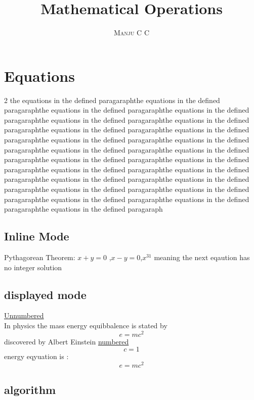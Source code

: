 \documentclass[12pt]{book}
\begin{document}
\title {\textbf {Mathematical Operations}}
\author{\textsc{Manju C C}}
\date {}
\maketitle 

\chapter{Equations}
\begin {multicols}{2}
the equations in the defined paragaraphthe equations in the defined paragaraphthe equations in the defined paragaraphthe equations in the defined paragaraphthe equations in the defined paragaraphthe equations in the defined paragaraphthe equations in the defined paragaraphthe equations in the defined paragaraphthe equations in the defined paragaraphthe equations in the defined paragaraphthe equations in the defined paragaraphthe equations in the defined paragaraphthe equations in the defined paragaraphthe equations in the defined paragaraphthe equations in the defined paragaraphthe equations in the defined paragaraphthe equations in the defined paragaraphthe equations in the defined paragaraphthe equations in the defined paragaraphthe equations in the defined paragaraphthe equations in the defined paragaraphthe equations in the defined paragaraphthe equations in the defined paragaraph

\section{Inline Mode}
Pythagorean Theorem: $ x+y=0 $ ,\(x-y=0\),$ x^{31} $ 
meaning the next eqaution has no integer solution
\section{displayed mode}
\underline{Unnumbered}\\
In physics the mass energy equibbalence is stated by  $$e=mc^2$$ discovered by Albert Einstein
\underline{numbered}\\
\begin{displaymath}
c=1
\end{displaymath}
energy eqyuation is :
\begin{equation}
e=mc^2
\end{equation}
\section{algorithm}
\begin{algorithm}[H]


\end{algorithm}
\end{multicols}
\end{document}

